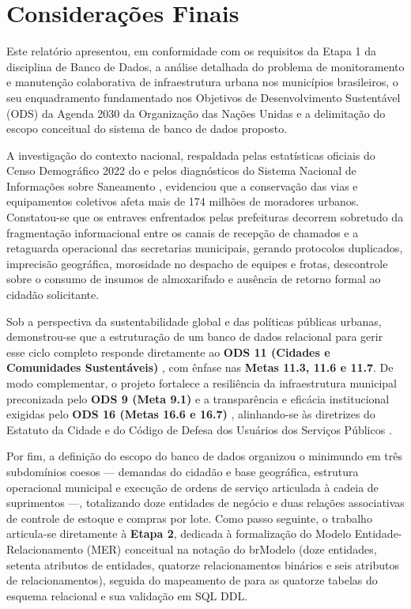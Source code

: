 \chapter{Considerações Finais}
\label{cap:consideracoes}

Este relatório apresentou, em conformidade com os requisitos da Etapa 1 da disciplina de Banco de Dados, a análise detalhada do problema de monitoramento e manutenção colaborativa de infraestrutura urbana nos municípios brasileiros, o seu enquadramento fundamentado nos Objetivos de Desenvolvimento Sustentável (ODS) da Agenda 2030 da Organização das Nações Unidas e a delimitação do escopo conceitual do sistema de banco de dados proposto.

A investigação do contexto nacional, respaldada pelas estatísticas oficiais do Censo Demográfico 2022 do  e pelos diagnósticos do Sistema Nacional de Informações sobre Saneamento \cite{snis2023drenagem, snis2023residuos}, evidenciou que a conservação das vias e equipamentos coletivos afeta mais de 174 milhões de moradores urbanos. Constatou-se que os entraves enfrentados pelas prefeituras decorrem sobretudo da fragmentação informacional entre os canais de recepção de chamados e a retaguarda operacional das secretarias municipais, gerando protocolos duplicados, imprecisão geográfica, morosidade no despacho de equipes e frotas, descontrole sobre o consumo de insumos de almoxarifado e ausência de retorno formal ao cidadão solicitante.

Sob a perspectiva da sustentabilidade global e das políticas públicas urbanas, demonstrou-se que a estruturação de um banco de dados relacional para gerir esse ciclo completo responde diretamente ao \textbf{ODS 11 (Cidades e Comunidades Sustentáveis)} \cite{onubrasil2015ods11, ipea2019ods11}, com ênfase nas \textbf{Metas 11.3, 11.6 e 11.7}. De modo complementar, o projeto fortalece a resiliência da infraestrutura municipal preconizada pelo \textbf{ODS 9 (Meta 9.1)} \cite{onubrasil2015ods9} e a transparência e eficácia institucional exigidas pelo \textbf{ODS 16 (Metas 16.6 e 16.7)} \cite{onubrasil2015ods16}, alinhando-se às diretrizes do Estatuto da Cidade \cite{brasil2001estatutocidade} e do Código de Defesa dos Usuários dos Serviços Públicos \cite{brasil2017lei13460}.

Por fim, a definição do escopo do banco de dados organizou o minimundo em três subdomínios coesos --- demandas do cidadão e base geográfica, estrutura operacional municipal e execução de ordens de serviço articulada à cadeia de suprimentos ---, totalizando doze entidades de negócio e duas relações associativas de controle de estoque e compras por lote. Como passo seguinte, o trabalho articula-se diretamente à \textbf{Etapa 2}, dedicada à formalização do Modelo Entidade-Relacionamento (MER) conceitual na notação do brModelo (doze entidades, setenta atributos de entidades, quatorze relacionamentos binários e seis atributos de relacionamentos), seguida do mapeamento de  para as quatorze tabelas do esquema relacional e sua validação em SQL DDL.
